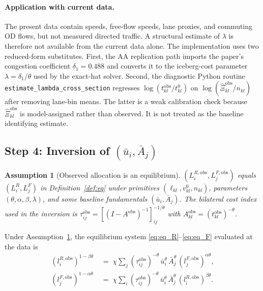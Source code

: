 \documentclass[12pt]{article}
\newtheorem{assumption}{Assumption}
\newcommand{\ubar}{\bar u}
\newcommand{\Abar}{\bar A}
\newcommand{\tkl}{t_{kl}}
\newcommand{\tijk}{\tau_{ij}}
\newcommand{\obs}{\mathrm{obs}}
\begin{document}
\paragraph{Application with current data.}
The present data contain speeds, free-flow speeds, lane proxies, and
commuting OD flows, but not measured directed traffic.  A structural
estimate of $\lambda$ is therefore not available from the current
data alone.\label{ssec:link_traffic_obs}  The implementation uses
two reduced-form substitutes.
First, the AA replication path imports the paper's congestion
coefficient $\delta_1=0.488$ and converts it to the iceberg-cost
parameter $\lambda=\delta_1/\theta$ used by the exact-hat solver.
Second, the diagnostic Python routine
\texttt{estimate\_lambda\_cross\_section} regresses
$\log(t_{kl}^{\obs}/t_{kl}^{0})$ on
$\log(\hat\Xi_{kl}^{\obs}/n_{kl})$ after removing lane-bin means.
The latter is a weak calibration check because
$\hat\Xi_{kl}^{\obs}$ is model-assigned rather than observed.  It is
not treated as the baseline identifying estimate.

\subsection{Step 4: Inversion of $(\ubar_i,\Abar_j)$}\label{ssec:invert}

\begin{assumption}[Observed allocation is an equilibrium]
\label{ass:obs_eq}
$(L_i^{R,\obs},L_j^{F,\obs})$ equals $(L_i^R,L_j^F)$ in
Definition~\ref{def:eq} under primitives
$(\ell_{kl},v_{kl}^{0},n_{kl})$, parameters
$(\theta,\alpha,\beta,\lambda)$, and some baseline fundamentals
$(\ubar_i,\Abar_j)$.  The bilateral cost index used in the inversion
is $\tijk^{\obs}=[(I-A^{\obs})^{-1}]_{ij}^{-1/\theta}$ with
$A^{\obs}_{kl}=(\tkl^{\obs})^{-\theta}$.
\end{assumption}

Under Assumption~\ref{ass:obs_eq}, the equilibrium system
\eqref{eq:eq_R}--\eqref{eq:eq_F} evaluated at the data is
\begin{align}
  (l_i^{R,\obs})^{1-\beta\theta}
  &\;=\;\chi\sum_{j}(\tijk^{\obs})^{-\theta}\,\ubar_i^{\theta}\,\Abar_j^{\theta}\,
       (l_j^{F,\obs})^{\alpha\theta},
  \label{eq:invert_R}\\
  (l_j^{F,\obs})^{1-\alpha\theta}
  &\;=\;\chi\sum_{i}(\tijk^{\obs})^{-\theta}\,\ubar_i^{\theta}\,\Abar_j^{\theta}\,
       (l_i^{R,\obs})^{\beta\theta}.
  \label{eq:invert_F}
\end{align}
\end{document}
